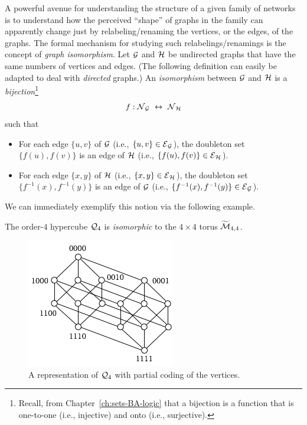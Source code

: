 A powerful avenue for understanding the structure of a given family of
networks is to understand how the perceived ``shape'' of graphs in the
family can apparently change just by relabeling/renaming the vertices, or
the edges, of the graphs.  The formal mechanism for studying such
relabelings/renamings is the concept of {\it graph isomorphism}.
 Let $\mbox{$\cal G$}$ and $\mbox{$\cal H$}$ be undirected graphs that
have the same numbers of vertices and edges.  (The following definition
can easily be adapted to deal with {\em directed} graphs.)  An {\it
  isomorphism} between $\mbox{$\cal G$}$ and $\mbox{$\cal H$}$ is a {\em
  bijection}\footnote{Recall, from Chapter~\ref{ch:sets-BA-logic} that
  a bijection is a function that is one-to-one (i.e., injective) and
  onto (i.e., surjective).}
\[ f: \mbox{$\cal N$}_{\mbox{{\scriptsize $\cal G$}}} \ \leftrightarrow \ \mbox{$\cal N$}_{\mbox{{\scriptsize $\cal H$}}} \]
such that
\begin{itemize}
\item
For each edge $\{ u,v \}$ of $\mbox{$\cal G$}$ (i.e., $\{ u,v \} \in \mbox{$\cal E$}_{\mbox{{\scriptsize $\cal G$}}}$),
the doubleton set $\{ f(u), f(v) \}$ is an edge of $\mbox{$\cal H$}$ (i.e.,
$\{ f(u), f(v) \} \in \mbox{$\cal E$}_{\mbox{{\scriptsize $\cal H$}}}$).
\item
For each edge $\{ x,y \}$ of $\mbox{$\cal H$}$ (i.e., $\{ x,y \} \in \mbox{$\cal E$}_{\mbox{{\scriptsize $\cal H$}}}$),
the doubleton set $\{ f^{-1}(x), f^{-1}(y) \}$ is an edge of $\mbox{$\cal G$}$ (i.e.,
$\{ f^{-1}(x), f^{-1}(y) \} \in \mbox{$\cal E$}_{\mbox{{\scriptsize $\cal G$}}}$).
\end{itemize}
We can immediately exemplify this notion via the following example.

\begin{prop}
The order-$4$ hypercube $\mbox{$\cal Q$}_4$ is \textit{isomorphic} to the $4 \times
4$ torus $\widetilde{\mbox{$\cal M$}}_{4,4}$.
\label{prop.graphIsomorphism}
\end{prop}

\begin{figure}[hbt]
\begin{center}
       \includegraphics[scale=0.6]{FiguresGraph/Isomorphism1}
       \caption{A representation of $\mbox{$\cal Q$}_4$ with partial coding of the vertices.}
  \label{fig:isomorphism1}
\end{center}
\end{figure}

